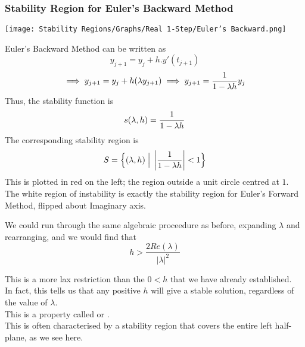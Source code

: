 \subsubsection{Stability Region for Euler's Backward Method}
\begin{multicols}{2}
\vspace*{\fill}
\begin{center}
\texttt{[image: Stability Regions/Graphs/Real 1-Step/Euler's Backward.png]}
\end{center}
\vspace*{\fill}
\columnbreak{}
Euler's Backward Method can be written as
\[y_{j+1} = y_j + h.y'(t_{j+1})\]
\[\implies y_{j+1} = y_j + h(\lambda y_{j+1}) \implies y_{j+1} = \frac{1}{1 - \lambda h}y_j\]
Thus, the stability function is
\[s(\lambda, h) = \frac{1}{1 - \lambda h}\]
The corresponding stability region is
\[S = \Big\{ (\lambda, h) \;\Big|\; \left|\frac{1}{1 - \lambda h}\right| < 1\Big\}\]
This is plotted in red on the left; the region outside a unit circle centred at $1$.\\
The white region of instability is exactly the stability region for Euler's Forward Method, flipped about Imaginary axis.\\

\par We could run through the same algebraic proceedure as before, expanding $\lambda$ and rearranging, and we would find that 
\[h > \frac{2 Re(\lambda)}{{|\lambda|}^2}\]
\end{multicols}
This is a more lax restriction than the $0<h$ that we have already established.\\
In fact, this tells us that any positive $h$ will give a stable solution, regardless of the value of $\lambda$.\\
This is a property called  or .\\
This is often characterised by a stability region that covers the entire left half-plane, as we see here.\\

